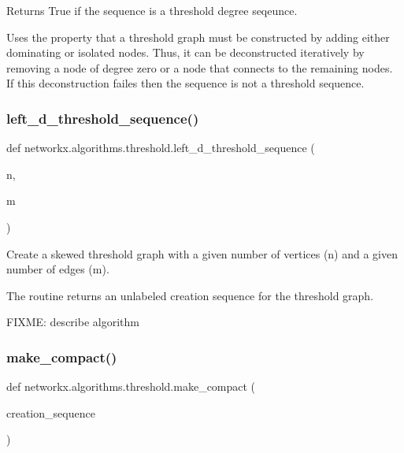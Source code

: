 \begin{DoxyVerb}Returns True if the sequence is a threshold degree seqeunce.

Uses the property that a threshold graph must be constructed by
adding either dominating or isolated nodes. Thus, it can be
deconstructed iteratively by removing a node of degree zero or a
node that connects to the remaining nodes.  If this deconstruction
failes then the sequence is not a threshold sequence.
\end{DoxyVerb}
 \mbox{\label{namespacenetworkx_1_1algorithms_1_1threshold_adf0e6232450ae760683623c67036f513}} 
\subsubsection{\texorpdfstring{left\+\_\+d\+\_\+threshold\+\_\+sequence()}{left\_d\_threshold\_sequence()}}
{\footnotesize\ttfamily def networkx.\+algorithms.\+threshold.\+left\+\_\+d\+\_\+threshold\+\_\+sequence (\begin{DoxyParamCaption}\item[{}]{n,  }\item[{}]{m }\end{DoxyParamCaption})}

\begin{DoxyVerb}Create a skewed threshold graph with a given number
of vertices (n) and a given number of edges (m).

The routine returns an unlabeled creation sequence
for the threshold graph.

FIXME: describe algorithm\end{DoxyVerb}
 \mbox{\label{namespacenetworkx_1_1algorithms_1_1threshold_aa16e6d28e3f28bffb1ffcb5c81068c9d}} 
\subsubsection{\texorpdfstring{make\+\_\+compact()}{make\_compact()}}
{\footnotesize\ttfamily def networkx.\+algorithms.\+threshold.\+make\+\_\+compact (\begin{DoxyParamCaption}\item[{}]{creation\+\_\+sequence }\end{DoxyParamCaption})}

